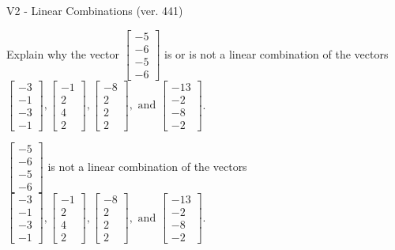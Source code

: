 \begin{exercise}
  \begin{exerciseTitle}V2 - Linear Combinations (ver. 441)\end{exerciseTitle}
  \begin{exerciseStatement}
    Explain why the vector \(\left[\begin{array}{c}
-5 \\
-6 \\
-5 \\
-6
\end{array}\right]\)  is or is not a linear 
	combination of the vectors \(\left[\begin{array}{c}
-3 \\
-1 \\
-3 \\
-1
\end{array}\right] , \left[\begin{array}{c}
-1 \\
2 \\
4 \\
2
\end{array}\right] , \left[\begin{array}{c}
-8 \\
2 \\
2 \\
2
\end{array}\right] , \text{ and } \left[\begin{array}{c}
-13 \\
-2 \\
-8 \\
-2
\end{array}\right]\).
	


  \end{exerciseStatement}
  \begin{exerciseAnswer}
   \(\left[\begin{array}{c}
-5 \\
-6 \\
-5 \\
-6
\end{array}\right]\) 
  	 is not  
	a linear combination of the vectors \(\left[\begin{array}{c}
-3 \\
-1 \\
-3 \\
-1
\end{array}\right] , \left[\begin{array}{c}
-1 \\
2 \\
4 \\
2
\end{array}\right] , \left[\begin{array}{c}
-8 \\
2 \\
2 \\
2
\end{array}\right] , \text{ and } \left[\begin{array}{c}
-13 \\
-2 \\
-8 \\
-2
\end{array}\right]\).


\end{exerciseAnswer}
\end{exercise}
